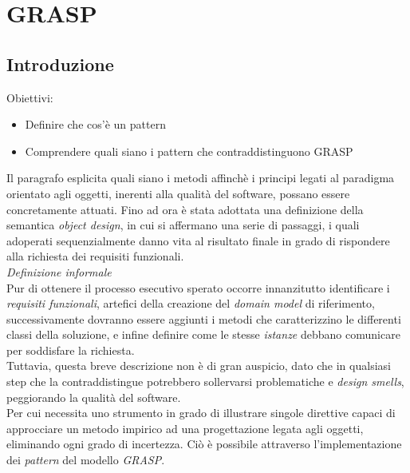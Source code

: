 \documentclass{article}
\begin{document}
\pagestyle{empty}
\section*{GRASP}
\large

\subsection*{Introduzione}
\large
Obiettivi:
\begin{itemize}
    \renewcommand{\labelitemi}{-}
    \itemsep0em
    \item Definire che cos'è un pattern
    \item Comprendere quali siano i pattern che contraddistinguono GRASP
\end{itemize}
Il paragrafo esplicita quali siano i metodi affinchè i principi legati al paradigma orientato agli oggetti, inerenti alla qualità del software, possano essere concretamente attuati. Fino ad ora è stata adottata una definizione della semantica \textit{object design}, in cui si affermano una serie di passaggi, i quali adoperati sequenzialmente danno vita al risultato finale in grado di rispondere alla richiesta dei requisiti funzionali.\vspace*{14pt}\\
\textit{Definizione informale}\\
Pur di ottenere il processo esecutivo sperato occorre innanzitutto identificare i \textit{requisiti funzionali}, artefici della creazione del \textit{domain model} di riferimento, successivamente dovranno essere aggiunti i metodi che caratterizzino le differenti classi della soluzione, e infine definire come le stesse \textit{istanze} debbano comunicare per soddisfare la richiesta.\vspace*{14pt}\\
Tuttavia, questa breve descrizione non è di gran auspicio, dato che in qualsiasi step che la contraddistingue potrebbero sollervarsi problematiche e \textit{design smells}, peggiorando la qualità del software.\vspace*{14pt}\\
Per cui necessita uno strumento in grado di illustrare singole direttive capaci di approcciare un metodo impirico ad una progettazione legata agli oggetti, eliminando ogni grado di incertezza. Ciò è possibile attraverso l'implementazione dei \textit{pattern} del modello \textit{GRASP}.
\end{document}
